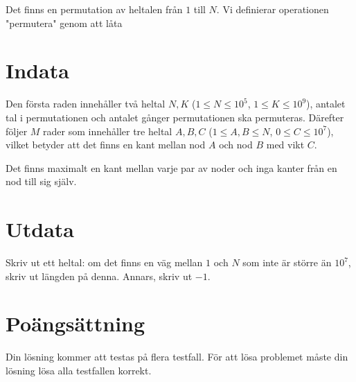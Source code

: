 Det finns en permutation av heltalen från $1$ till $N$. Vi definierar operationen "permutera"
genom att låta 

\section*{Indata}
Den första raden innehåller två heltal $N,K$ ($1 \leq N \leq 10^5$, $1 \leq K \leq 10^9$), antalet tal i
permutationen och antalet gånger permutationen ska permuteras.
Därefter följer $M$ rader som innehåller tre heltal $A,B,C$ ($1 \leq A,B \leq N$, $0 \leq C \leq 10^7$),
vilket betyder att det finns en kant mellan nod $A$ och nod $B$ med vikt $C$.

Det finns maximalt en kant mellan varje par av noder och inga kanter från en nod till sig själv.

\section*{Utdata}
Skriv ut ett heltal: om det finns en väg mellan $1$ och $N$ som inte är större än $10^7$, skriv ut längden på denna.
Annars, skriv ut $-1$.

\section*{Poängsättning}
Din lösning kommer att testas på flera testfall.
\noindent
För att lösa problemet måste din lösning lösa alla testfallen korrekt.

